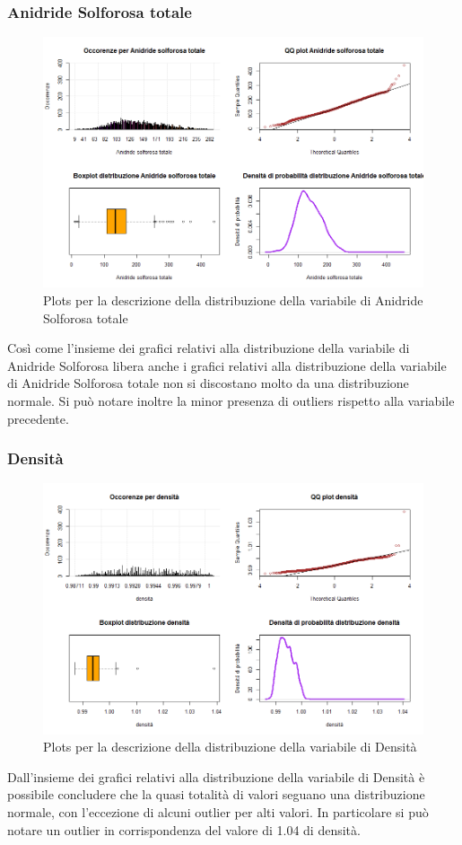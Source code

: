 \documentclass[12pt]{article}
\begin{document}
\subsubsection{Anidride Solforosa totale}
\begin{figure}[!htb]
    \centering
    \includegraphics[width=1\textwidth]{immagini/antot.png}
    \caption{Plots per la descrizione della distribuzione della variabile di Anidride Solforosa totale}
\end{figure}
\FloatBarrier
Così come l'insieme dei grafici relativi alla distribuzione della variabile di Anidride Solforosa libera anche i grafici relativi alla distribuzione della variabile di Anidride Solforosa totale non si discostano molto da una distribuzione normale. Si può notare inoltre la minor presenza di outliers rispetto alla variabile precedente.
\newpage
\subsubsection{Densità}
\begin{figure}[!htb]
    \centering
    \includegraphics[width=1\textwidth]{immagini/den.png}
    \caption{Plots per la descrizione della distribuzione della variabile di Densità}
\end{figure}
\FloatBarrier
Dall'insieme dei grafici relativi alla distribuzione della variabile di Densità è possibile concludere che la quasi totalità di valori seguano una distribuzione normale, con l'eccezione di alcuni outlier per alti valori. In particolare si può notare un outlier in corrispondenza del valore di 1.04 di densità.
\newpage
\end{document}
